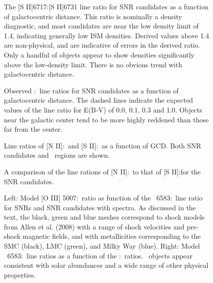 \begin{figure}
\caption{The [S II]6717:[S II]6731 line ratio for SNR candidates as a function of galactocentric distance.  This ratio is nominally a density diagnostic, and most candidates are near the low density limit of 1.4, indicating generally low ISM densities. Derived values above 1.4 are non-physical, and are indicative of errors in the derived ratio.  Only a handful of objects appear to show densities significantly above the low-density limit.  There is no obvious trend with galactocentric distance.  \label{fig_s2_ratio}}
\end{figure}

\begin{figure}
\caption{Observed \hb:\ha\ line ratios for SNR candidates as a function of galactocentric distance. The dashed lines indicate the expected values of the line ratio for E(B-V) of 0.0, 0.1, 0.3 and 1.0.  Objects near the galactic center tend to be more highly reddened than those far from the center. \label{fig_reddening}}
\end{figure}

\begin{figure}
\caption{Line ratios of [N II]:\ha\ and [S II]:\ha\ as a function of GCD.  Both SNR candidates and \hii\ regions are shown.     \label{fig_metal_ratios}}

\end{figure}

\begin{figure}
\caption{A comparison of the line rations of [N II]:\ha\ to that of [S II]:\ha for the SNR candidates. \label{fig_s2_n2}}
\end{figure}


\begin{figure}
\caption{Left: Model [O III] 5007:\hb\ ratio as function of the \nii\ 6583:\ha\ line ratio for SNRs and SNR candidates with spectra. As discussed in the text, the black, green and blue meshes correspond to shock models from Allen et al. (2008) with a range of shock velocities and pre-shock magnetic fields, and with metallicities corresponding to the SMC (black), LMC (green), and Milky Way (blue).  Right: Model \nii\ 6583:\ha\ line ratios as a function of the \sii:\ha\ ratios.  \gal\ objects appear consistent with solar abundances and a wide range of other physical properties.  \label{fig_model}}
\end{figure}

